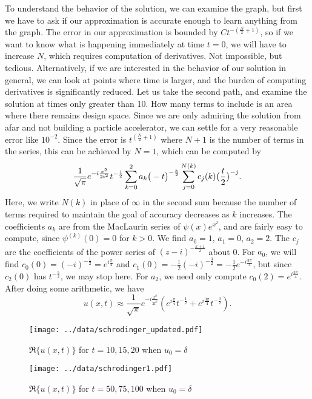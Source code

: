 To understand the behavior of the solution, we can examine the graph, but first we have to ask if our approximation is accurate enough to learn anything from the graph. The error in our approximation is bounded by $Ct^{-(\frac{N}{2}+1)}$, so if we want to know what is happening immediately at time $t=0$, we will have to increase $N$, which requires computation of derivatives. Not impossible, but tedious. Alternatively, if we are interested in the behavior of our solution in general, we can look at points where time is larger, and the burden of computing derivatives is significantly reduced. Let us take the second path, and examine the solution at times only greater than 10. How many terms to include is an area where there remains design space. Since we are only admiring the solution from afar and not building a particle accelerator, we can settle for a very reasonable error like $10^{-2}$. Since the error is $t^(\frac{N}{2}+1)$ where $N+1$ is the number of terms in the series, this can be achieved by $N=1$, which can be computed by
\[
\frac{1}{\sqrt{\pi}}e^{-i\frac{x^2}{2t^2}}t^{-\frac{1}{2}}\sum_{k=0}^2a_k\big(-t\big)^{-\frac{k}{2}}\sum_{j=0}^{N(k)} c_j(k)\big(\frac{t}{2}\big)^{-j}.
\]
Here, we write $N(k)$ in place of $\infty$ in the second sum because the number of terms required to maintain the goal of accuracy decreases as $k$ increases.
The coefficients $a_k$ are from the MacLaurin series of $\psi(x)e^{x^2}$, and are fairly easy to compute, since $\psi^{(k)}(0) = 0$ for $k > 0$. We find $a_0 = 1$, $a_1 = 0$, $a_2 = 2$. 
The $c_j$ are the coefficients of the power series of $(z-i)^{-\frac{k+1}{2}}$ about 0. For $a_0$, we will find $c_0(0) = (-i)^{-\frac{1}{2}} = e^{i\frac{\pi}{4}}$ and $c_1(0) = -\frac{1}{2}(-i)^{-\frac{3}{2}}= -\frac{1}{2}e^{-i\frac{3\pi}{4}}$, but since $c_2(0)$ has $t^{-\frac{5}{2}}$, we may stop here. For $a_2$, we need only compute $c_0(2) = e^{i\frac{3\pi}{4}}$. After doing some arithmetic, we have 
\[
u(x, t) \approx \frac{1}{\sqrt{\pi}}e^{-i\frac{x^2}{2t^2}}(e^{i\frac{\pi}{4}}t^{-\frac{1}{2}} + e^{i\frac{3\pi}{4}}t^{-\frac{3}{2}}).
\]
\begin{figure}
	\texttt{[image: ../data/schrodinger\_updated.pdf]}
	\caption{\label{fig:schrodinger} $\Re\{u(x, t)\}$ for $t = 10, 15, 20$ when $u_0 = \delta$}
\end{figure}
\begin{figure}
	\texttt{[image: ../data/schrodinger1.pdf]}
	\caption{\label{fig:schrodinger1} $\Re\{u(x, t)\}$ for $t = 50, 75, 100$ when $u_0 = \delta$}
\end{figure}

